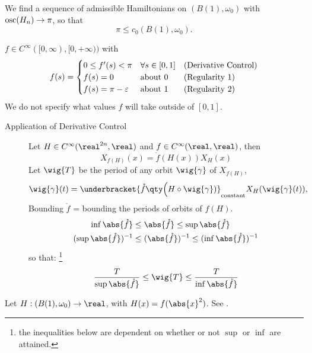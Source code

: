 \documentclass[../main-v2-manifolds.tex]{subfiles}
\begin{document}
\begin{wts}\label{thm:non-triviality}
We find a sequence of admissible Hamiltonians on $(B(1),\omega_0)$ with $\mathrm{osc}(H_n)\to \pi$, so that
\[\pi \leq c_0 (B(1), \omega_0).\]
\end{wts}
\begin{definition}[Mollifier 1]\label{def:mollifier-1}
$f \in C^\infty([0, \infty), [0, +\infty))$ with
\[
f(s) = \begin{cases}
0 \leq f'(s) < \pi &  \forall s\in[0,1] \quad \text{(Derivative Control)} \\
f(s) = 0 & \text{about } $0$ \quad \ \ \: \text{(Regularity 1)} \\ 
f(s) = \pi - \varepsilon & \text{about } $1$ \quad\ \ \:  \text{(Regularity 2)}
\end{cases}
\]
We do not specify what values $f$ will take outside of $[0,1]$.
\end{definition}


\begin{description}
    \item[Application of Derivative Control]
    Let $H\in C^\infty(\realtn,\real)$ and $f\in C^\infty(\real,\real)$, then 
    \[
        X_{f(H)}(x) = \mathring{f}(H(x))X_H(x)
    \]
    Let $\wig{T}$ be the period of any orbit $\wig{\gamma}$ of $X_{f(H)}$,
    \[
        \wig{\gamma}(t) = \underbracket{\mathring{f}\qty\Big(H\circ \wig{\gamma})}_{\text{constant}} X_H(\wig{\gamma}(t)),
    \]
    Bounding $\mathring{f}$ = bounding the periods of orbits of $f(H)$.
    \begin{align*}
    \inf\abs{\mathring{f}} &\leq \abs{\mathring{f}} \leq \sup\abs{\mathring{f}}\\
    (\sup\abs{\mathring{f}})^{-1} &\leq (\abs{\mathring{f}})^{-1} \leq (\inf\abs{\mathring{f}})^{-1}
    \end{align*}
    so that: \footnote{the inequalities below are dependent on whether or not $\sup$ or $\inf$ are attained.} 
    \[
        \dfrac{T}{\sup\abs{\mathring{f}}} \leq \wig{T} \leq \dfrac{T}{\inf\abs{\mathring{f}}}
    \]
\end{description}
\begin{definition}
    Let $H: (B(1),\omega_0)\to\real$, with $H(x) = f(\abs{x}^2)$. See .
\end{definition}
\end{document}
